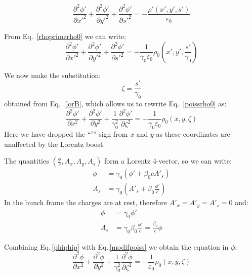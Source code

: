 \begin{equation}
\frac{\partial^2 \phi'}{\partial x'^2} +  \frac{\partial^2 \phi'}{\partial y'^2}+  \frac{\partial^2 \phi'}{\partial s'^2}= -\frac{\rho' (x', y', s')}{\varepsilon_0}
\end{equation}

From Eq.~\ref{rhoprimerho0} we can write:
\begin{equation}
\frac{\partial^2 \phi'}{\partial x'^2} +  \frac{\partial^2 \phi'}{\partial y'^2}+  \frac{\partial^2 \phi'}{\partial s'^2}= -\frac{1}{\gamma_0\varepsilon_0}  \rho_0 \left(x', y', \frac{s'}{\gamma_0}\right)\label{poissrho0}
\end{equation}

We now make the substitution:
\begin{equation}
\zeta = \frac{s'}{\gamma_0} \label{subst}
\end{equation}
obtained from Eq.~\ref{lorB}, which allows us to rewrite Eq.~\ref{poissrho0} as:
\begin{equation}
\frac{\partial^2 \phi'}{\partial x^2} +  \frac{\partial^2 \phi'}{\partial y^2}+  \frac{1}{\gamma_0^2}\frac{\partial^2 \phi'}{\partial \zeta^2}=  -\frac{1}{\gamma_0\varepsilon_0}{\rho}_0 \left(x, y,\zeta\right) \label{modifpoiss}
\end{equation}
Here we have dropped the ``$'$'' sign from $x$ and $y$ as these coordinates are unaffected by the Lorentz boost.




The quantities $\left( \frac{\phi}{c}, A_x, A_y, A_s\right)$ form a Lorentz 4-vector, so we can write:
\begin{align}
\phi &= \gamma_0 \left( {\phi'} +  \beta_0 c A'_s\right)\\
A_s &= \gamma_0 \left(A'_s +\beta_0 \frac{\phi'}{c}\right)
\end{align}
In the bunch frame the charges are at rest, therefore $A'_x=A'_y=A'_s=0$ and:
\begin{align}
\phi &= \gamma_0 \phi'\label{phiphip}\\
A_s &= \gamma_0\beta_0 \frac{\phi'}{c} =  \frac{\beta_0}{c}\phi
\end{align}

Combining Eq.\,\ref{phiphip} with Eq.\,\ref{modifpoiss} we obtain the equation in $\phi$:
\begin{equation}
\boxed{
\frac{\partial^2 \phi}{\partial x^2} +  \frac{\partial^2 \phi}{\partial y^2}+  \frac{1}{\gamma_0^2}\frac{\partial^2 \phi}{\partial \zeta^2}=  -\frac{1}{\varepsilon_0}{\rho}_0 \left(x, y,\zeta\right)} \label{modifpoiss_zeta}
\end{equation}

